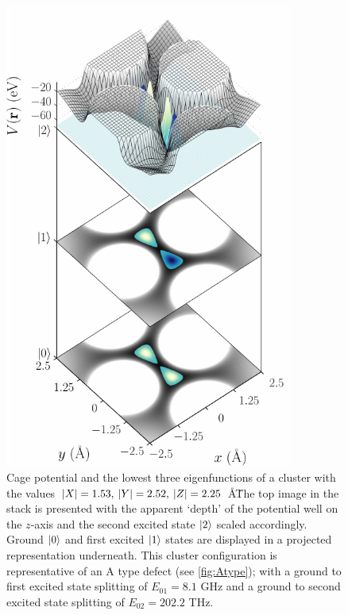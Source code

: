 \begin{figure}[p]
\includegraphics[width=0.85\textwidth]{figures/wfstackA}
\caption[A Type Energy States]{\label{fig:wfstackA}Cage potential and the lowest three eigenfunctions of a cluster with the values $\lvert X\rvert=1.53, \: \lvert Y\rvert = 2.52, \: \lvert Z\rvert = 2.25$ \AA\. The top image in the stack is presented with the apparent `depth' of the potential well on the $z$-axis and the second excited state $\lvert2\rangle$ scaled accordingly. Ground $\lvert0\rangle$ and first excited $\lvert1\rangle$ states are displayed in a projected representation underneath. This cluster configuration is representative of an A type defect (see \cref{fig:Atype}); with a ground to first excited state splitting of $E_{01} = 8.1$ GHz and a ground to second excited state splitting of $E_{02} = 202.2$ THz.}
\end{figure}

